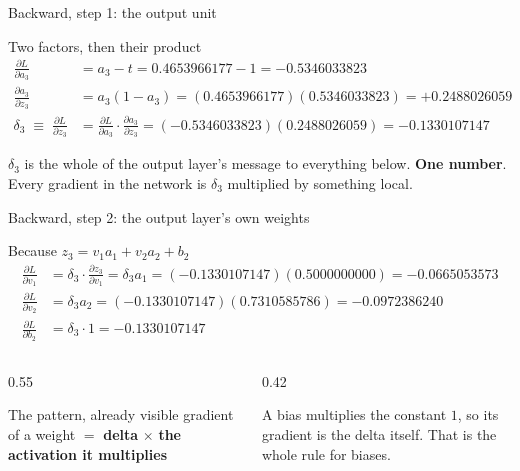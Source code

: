 \documentclass[aspectratio=169]{beamer}
\begin{document}
\begin{frame}[shrink=5]{Backward, step 1: the output unit}
  \begin{block}{Two factors, then their product}
    \begin{align*}
      \frac{\partial L}{\partial a_3}
        &= a_3 - t = 0.4653966177 - 1 = \mathbf{-0.5346033823}\\[0.3em]
      \frac{\partial a_3}{\partial z_3}
        &= a_3(1 - a_3) = (0.4653966177)(0.5346033823)
         = \mathbf{+0.2488026059}\\[0.3em]
      \delta_3 \;\equiv\; \frac{\partial L}{\partial z_3}
        &= \frac{\partial L}{\partial a_3}\cdot\frac{\partial a_3}{\partial z_3}
         = (-0.5346033823)(0.2488026059) = \mathbf{-0.1330107147}
    \end{align*}
  \end{block}
  \begin{center}\small
    $\delta_3$ is the whole of the output layer's message to everything
    below. \textbf{One number}. Every gradient in the network is $\delta_3$
    multiplied by something local.
  \end{center}
\end{frame}

\begin{frame}[shrink=6]{Backward, step 2: the output layer's own weights}
  \begin{block}{Because $z_3 = v_1a_1 + v_2a_2 + b_2$}
    \begin{align*}
      \frac{\partial L}{\partial v_1}
        &= \delta_3 \cdot \frac{\partial z_3}{\partial v_1} = \delta_3 a_1
         = (-0.1330107147)(0.5000000000) = \mathbf{-0.0665053573}\\
      \frac{\partial L}{\partial v_2}
        &= \delta_3 a_2
         = (-0.1330107147)(0.7310585786) = \mathbf{-0.0972386240}\\
      \frac{\partial L}{\partial b_2}
        &= \delta_3 \cdot 1 = \mathbf{-0.1330107147}
    \end{align*}
  \end{block}
  \begin{columns}[T]
    \begin{column}{0.55\textwidth}
      \begin{exampleblock}{The pattern, already visible}
        \centering
        gradient of a weight $=$ \textbf{delta} $\times$ \textbf{the
        activation it multiplies}
      \end{exampleblock}
    \end{column}
    \begin{column}{0.42\textwidth}
      \begin{alertblock}{}
        \small A bias multiplies the constant $1$, so its gradient is the
        delta itself. That is the whole rule for biases.
      \end{alertblock}
    \end{column}
  \end{columns}
\end{frame}
\end{document}
